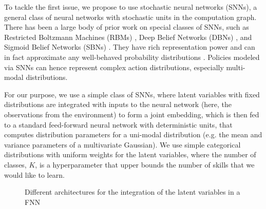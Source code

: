 \documentclass{article} %
\begin{document}
To tackle the first issue, we propose to use stochastic neural networks (SNNs), a general class of neural networks with stochastic units in the computation graph. There has been a large body of prior work on special classes of SNNs, such as Restricted Boltzmann Machines (RBMs) \citep{smolensky1986information, hinton2002training}, Deep Belief Networks (DBNs) \citep{hinton2006fast}, and Sigmoid Belief Networks (SBNs) \citep{neal1990learning, Tang2014_FSNN}. They have rich representation power and can in fact approximate any well-behaved probability distributions \citep{le2008representational, cho2013gaussian}. Policies modeled via SNNs can hence represent complex action distributions, especially multi-modal distributions.

For our purpose, we use a simple class of SNNs, where latent variables with fixed distributions are integrated with inputs to the neural network (here, the observations from the environment) to form a joint embedding, which is then fed to a standard feed-forward neural network with deterministic units, that computes distribution parameters for a uni-modal distribution (e.g. the mean and variance parameters of a multivariate Gaussian). We use simple categorical distributions with uniform weights for the latent variables, where the number of classes, $K$, is a hyperparameter that upper bounds the number of skills that we would like to learn.%
\begin{figure}[th]
	\centering
	\caption{Different architectures for the integration of the latent variables in a FNN}
	\label{fig:snn_architecture}
\end{figure}
\end{document}
